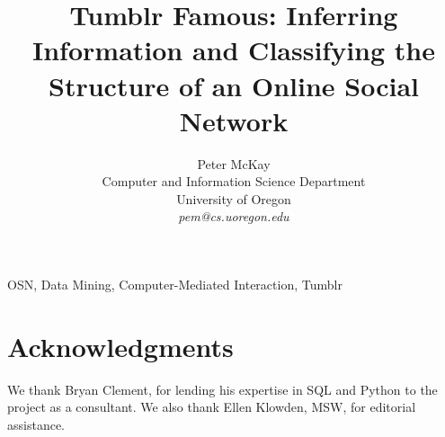 \documentclass[10pt,twocolumn]{IEEEtran11}
\begin{document}
%


\title{\Large \bf Tumblr Famous: Inferring Information and Classifying the Structure of an Online Social Network
}
\author{
Peter McKay\\
Computer and Information Science Department\\
University of Oregon\\
{\em pem@cs.uoregon.edu}
}
\maketitle


\begin{keywords} 
OSN, Data Mining, Computer-Mediated Interaction, Tumblr
\end{keywords}









\section{Acknowledgments}
We thank Bryan Clement, for lending his expertise in SQL and Python to 
the project as a consultant. We also thank Ellen Klowden, MSW, for 
editorial assistance.


\end{document}
